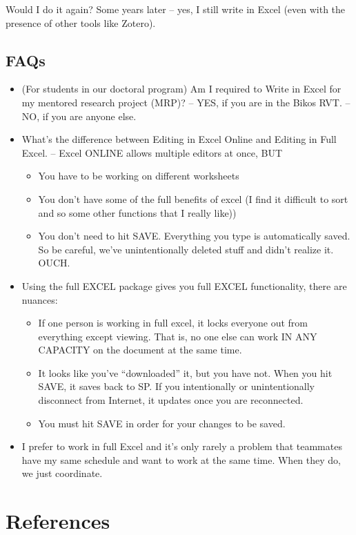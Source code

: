 \documentclass[
  english,
]{book}
\providecommand{\tightlist}{%
  \setlength{\itemsep}{0pt}\setlength{\parskip}{0pt}}
\begin{document}
Would I do it again? Some years later -- yes, I still write in Excel (even with the presence of other tools like Zotero).

\hypertarget{faqs}{%
\section{FAQs}\label{faqs}}

\begin{itemize}
\item
  (For students in our doctoral program) Am I required to Write in Excel for my mentored research project (MRP)?
  -- YES, if you are in the Bikos RVT.
  -- NO, if you are anyone else.
\item
  What's the difference between Editing in Excel Online and Editing in Full Excel.
  -- Excel ONLINE allows multiple editors at once, BUT

  \begin{itemize}
  \tightlist
  \item
    You have to be working on different worksheets
  \item
    You don't have some of the full benefits of excel (I find it difficult to sort and so some other functions that I really like))
  \item
    You don't need to hit SAVE. Everything you type is automatically saved. So be careful, we've unintentionally deleted stuff and didn't realize it. OUCH.
  \end{itemize}
\item
  Using the full EXCEL package gives you full EXCEL functionality, there are nuances:

  \begin{itemize}
  \tightlist
  \item
    If one person is working in full excel, it locks everyone out from everything except viewing. That is, no one else can work IN ANY CAPACITY on the document at the same time.
  \item
    It looks like you've ``downloaded'' it, but you have not. When you hit SAVE, it saves back to SP. If you intentionally or unintentionally disconnect from Internet, it updates once you are reconnected.
  \item
    You must hit SAVE in order for your changes to be saved.
  \end{itemize}
\item
  I prefer to work in full Excel and it's only rarely a problem that teammates have my same schedule and want to work at the same time. When they do, we just coordinate.
\end{itemize}

\hypertarget{references}{%
\chapter{References}\label{references}}

  
\end{document}
